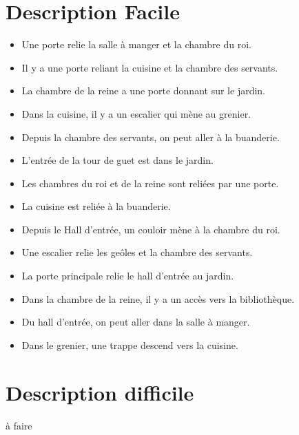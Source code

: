 \documentclass{article}
\begin{document}
\section{Description Facile}
\begin{itemize}
\item Une porte relie la salle à manger et la chambre du roi.
\item Il y a une porte reliant la cuisine et la chambre des servants.
\item La chambre de la reine a une porte donnant sur le jardin.
\item Dans la cuisine, il y a un escalier qui mène au grenier.
\item Depuis la chambre des servants, on peut aller à la buanderie.
\item L'entrée de la tour de guet est dans le jardin.
\item Les chambres du roi et de la reine sont reliées par une porte.
\item La cuisine est reliée à la buanderie.
\item Depuis le Hall d'entrée, un couloir mène à la chambre du roi.
\item Une escalier relie les geôles et la chambre des servants.
\item La porte principale relie le hall d'entrée au jardin.
\item Dans la chambre de la reine, il y a un accès vers la bibliothèque.
\item Du hall d'entrée, on peut aller dans la salle à manger.
\item Dans le grenier, une trappe descend vers la cuisine.
\end{itemize}

\section{Description difficile}
à faire
\end{document}
